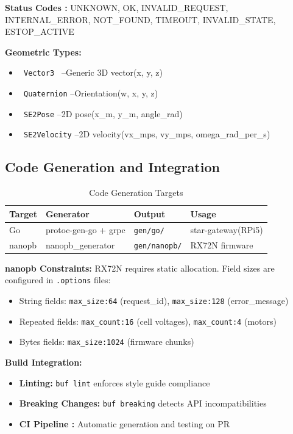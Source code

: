 \textbf{Status Codes :} UNKNOWN, OK, INVALID\_REQUEST, INTERNAL\_ERROR,
    NOT\_FOUND, TIMEOUT, INVALID\_STATE,
    ESTOP\_ACTIVE

\textbf{Geometric Types:
}
\begin{itemize}[leftmargin = 1.5em, topsep = 4pt, itemsep = 2pt]
    \item \texttt {
  Vector3
}
--Generic 3D vector(x, y, z)
    \item \texttt { Quaternion}
--Orientation(w, x, y, z)
    \item \texttt { SE2Pose}
--2D pose(x\_m, y\_m, angle\_rad)
    \item \texttt { SE2Velocity}
--2D velocity(vx\_mps, vy\_mps, omega\_rad\_per\_s)
\end{itemize}

\subsection{Code Generation and Integration}

\begin{table}[H]
\centering
\caption{Code Generation Targets}
\label{tab:codegen}
\begin{tabular}{|l|l|l|l|}
\hline
\textbf{Target} & \textbf{Generator} & \textbf{Output} & \textbf{Usage} \\
\hline
Go & protoc-gen-go + grpc & \texttt{gen/go/} & star-gateway(RPi5) \\
\hline
nanopb & nanopb\_generator & \texttt{gen/nanopb/} & RX72N firmware \\
\hline
\end{tabular}
\end{table}

\textbf{nanopb Constraints:} RX72N requires static allocation. Field sizes are configured in \texttt{.options} files:
\begin{itemize}[leftmargin=1.5em,topsep=4pt,itemsep=2pt]
    \item String fields: \texttt{max\_size:64} (request\_id), \texttt{max\_size:128} (error\_message)
    \item Repeated fields: \texttt{max\_count:16} (cell voltages), \texttt{max\_count:4} (motors)
    \item Bytes fields: \texttt{max\_size:1024} (firmware chunks)
\end{itemize}

\textbf{Build Integration:}
\begin{itemize}[leftmargin = 1.5em, topsep = 4pt, itemsep = 2pt]
    \item \textbf{Linting:
}
\texttt{buf lint} enforces style guide compliance
    \item \textbf{Breaking Changes:
}
\texttt{buf breaking} detects API incompatibilities
    \item \textbf{CI Pipeline :} Automatic generation and testing on PR
\end{itemize}

